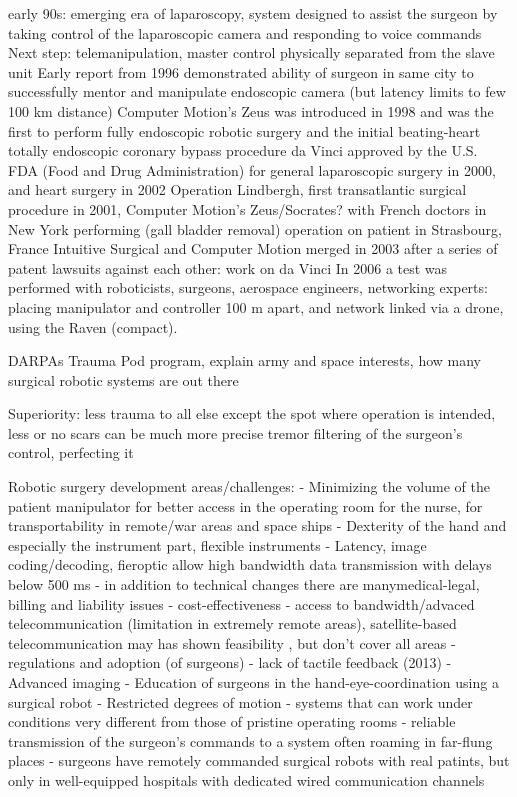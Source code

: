 early 90s: emerging era of laparoscopy, system designed to assist the surgeon by taking control of the laparoscopic camera and responding to voice commands
Next step: telemanipulation, master control physically separated from the slave unit
Early report from 1996 demonstrated ability of surgeon in same city to successfully mentor and manipulate endoscopic camera (but latency limits to few 100 km distance)
Computer Motion's Zeus was introduced in 1998 and was the first to perform fully endoscopic robotic surgery and the initial beating-heart totally endoscopic coronary bypass procedure \cite{bib:brown_univ}
da Vinci approved by the U.S. FDA (Food and Drug Administration) for general laparoscopic surgery in 2000, and heart surgery in 2002 \cite{bib:brown_univ}
Operation Lindbergh, first transatlantic surgical procedure in 2001, Computer Motion's Zeus/Socrates? with French doctors in New York performing (gall bladder removal) operation on patient in Strasbourg, France
Intuitive Surgical and Computer Motion merged in 2003 after a series of patent lawsuits against each other: work on da Vinci
In 2006 a test was performed with roboticists, surgeons, aerospace engineers, networking experts: placing manipulator and controller 100 m apart, and network linked via a drone, using the Raven \cite{bib:docatadist} (compact).

DARPAs Trauma Pod program, explain army and space interests, how many surgical robotic systems are out there


Superiority:
less trauma to all else except the spot where operation is intended, less or no scars
can be much more precise
tremor filtering of the surgeon's control, perfecting it

Robotic surgery development areas/challenges:
- Minimizing the volume of the patient manipulator for better access in the operating room for the nurse, for transportability in remote/war areas and space ships
- Dexterity of the hand and especially the instrument part, flexible instruments
- Latency, image coding/decoding, fieroptic allow high bandwidth data transmission with delays below 500 ms
- in addition to technical changes there are manymedical-legal, billing and liability issues
- cost-effectiveness
- access to bandwidth/advaced telecommunication (limitation in extremely remote areas), satellite-based telecommunication may has shown feasibility \cite{bib:telesurg_history}, but don't cover all areas \cite{bib:docatadist}
- regulations and adoption (of surgeons)
- lack of tactile feedback (2013)
- Advanced imaging
- Education of surgeons in the hand-eye-coordination using a surgical robot
- Restricted degrees of motion
- systems that can work under conditions very different from those of pristine operating rooms \cite{bib:docatadist}
- reliable transmission of the surgeon's commands to a system often roaming in far-flung places
- surgeons have remotely commanded surgical robots with real patints, but only in well-equipped hospitals with dedicated wired communication channels

